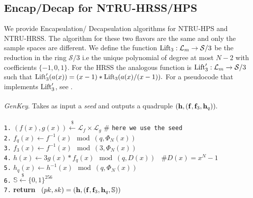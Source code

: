 \documentclass{amsart}
\numberwithin{equation}{section}
\begin{document}
{ \subsection{Encap/Decap for NTRU-HRSS/HPS}
 We provide Encapsulation/ Decapsulation algorithms for NTRU-HPS and NTRU-HRSS. The algorithm for these two flavors are the same and only the sample spaces are different. We define the function ${\rm{Lift}_3}:{\mathcal{L}}_m\rightarrow {\mathcal{S}}/3$ be the reduction in the ring ${\mathcal{S}}/3$ i.e the unique polynomial of degree at most $N-2$ with coefficients $\{-1,0,1\}.$ For the HRSS the analogous function is ${\rm{Lift}'_3}:{\mathcal{L}}_m\rightarrow {\mathcal{S}}/3$ such that ${\rm{Lift}'_3}(a(x))=(x-1)*{\rm{Lift}_3}(a(x)/(x-1)).$ For a pseudocode that implements ${\rm{Lift}'_3}$, see \cite[Appendix 2 - Algorithm 8]{HRSS-2}.\\\\
 {\it GenKey}. Takes as input a {\it{seed}} and outputs a quadruple $({\bf h},({\bf f},{\bf f}_3,{\bf h}_q)).$\\\\
\texttt{1.}   $(f(x),g(x))\xleftarrow{\$} {\mathcal{L}}_f\times {\mathcal{L}}_g$ \hspace{10pt} \# {\texttt{here\ we\ use  the seed}}\\
\texttt{2.}  $f_q(x)\leftarrow f^{-1}(x)\mod{(q,\Phi_N(x))}$\\
\texttt{3.}   $f_3(x)\leftarrow f^{-1}(x)\mod{(3,\Phi_N(x))}$\\
\texttt{4.}   $h(x) \leftarrow 3g(x)*f_q(x)\mod{(q,D(x))}$ \ $\# D(x)=x^N-1$\\
\texttt{5.}  $ h_q(x) \leftarrow h^{-1}(x)\mod{(q,\Phi_N(x))}$\ \\  
\texttt{6.}  $ {\mathbb{S}} \xleftarrow{\$} \{0,1\}^{256}$\ \\ 
\texttt{7.}   {\bf return} \ $(pk,sk)=({\bf h},({\bf f},{\bf f}_3,{\bf h}_q,{\mathbb{S}}))
 $\\

}
\end{document}
